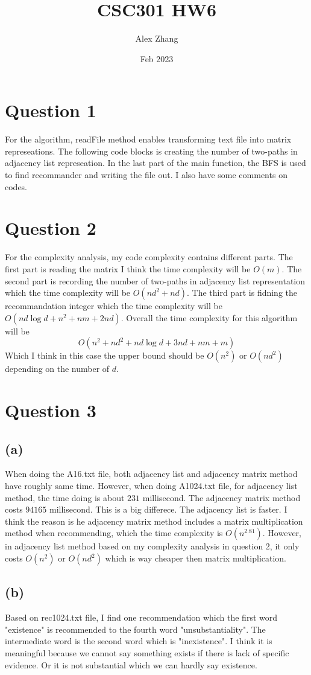 \documentclass{article}
\title{CSC301 HW6}
\author{Alex Zhang}
\date{Feb 2023}
\begin{document}
\maketitle

\section*{Question 1}
For the algorithm, readFile method enables transforming text file into matrix represeations.
The following code blocks is creating the number of two-paths in adjacency list represeation.
In the last part of the main function, the BFS is used to find recommander and writing the file out.
I also have some comments on codes.



\section*{Question 2}
For the complexity analysis, my code complexity contains different parts.
The first part is reading the matrix I think the time complexity will be $O(m)$. The second part
is recording the number of two-paths in adjacency list representation which the time complexity will be $O(nd^2 + nd)$.
The third part is fidning the recommandation integer which the time complexity will be $O(nd\log d + n^2 + nm + 2nd)$. Overall 
the time complexity for this algorithm will be
$$O(n^2 + nd^2 + nd\log d + 3nd + nm + m)$$
Which I think in this case the upper bound should be $O(n^2)$ or $O(nd^2)$ depending on the number of $d$.

\section*{Question 3}


\subsection*{(a)}
When doing the A16.txt file, both adjacency list and adjacency matrix method have roughly same time. However,
when doing A1024.txt file, for adjacency list method, the time doing is about $231$ millisecond. The adjacency matrix method costs $94165$ millisecond.
This is a big differece. The adjacency list is faster.
I think the reason is he adjacency matrix method includes a matrix multiplication method when recommending, which the time complexity is $O(n^{2.81})$.
However, in adjacency list method based on my complexity analysis in question 2, it only costs $O(n^2)$ or $O(nd^2)$ which is way cheaper then 
matrix multiplication.

\subsection*{(b)}
Based on rec1024.txt file, I find one recommendation which the first word "existence" is recommended to the fourth word "unsubstantiality".
The intermediate word is the second word which is "inexistence". I think it is meaningful because we cannot say something exists if there is lack
of specific evidence. Or it is not substantial which we can hardly say existence.
\end{document}
